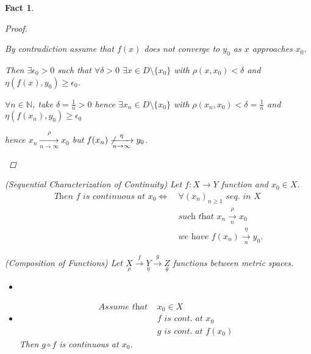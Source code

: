 \documentclass[12pt]{amsbook}
\newtheorem{fact}[theorem]{Fact}
\theoremstyle{definition}
\newcommand{\NN}{{\mathbb N}}
\newcommand{\Lra}{\Leftrightarrow} %
\newcommand{\ra}{\rightarrow} %
\begin{document}
\begin{fact}
\begin{proof}
\begin{itemize}
    By contradiction assume that $f(x)$ does not converge to $y_0$ as $x$ approaches $x_0$. 
    
    Then $\exists \epsilon_0 > 0$ such that $\forall \delta > 0$ $\exists x \in D \setminus \{x_0\}$ with $\rho(x, x_0) < \delta$ and $\eta(f(x), y_0) \geq \epsilon_0$.
    
    $\forall n \in \NN$, take $\delta = \frac{1}{n} > 0$ hence $\exists x_n \in D \setminus \{x_0\}$ with $\rho(x_n, x_0) < \delta = \frac{1}{n}$ and $\eta(f(x_n), y_0) \geq \epsilon_0$
    
    hence $x_n \xrightarrow[n \ra \infty]{\rho} x_0$ but $f(x_n) \not\xrightarrow[n \ra \infty]{\eta} y_0$. %
    \end{itemize}
    \end{proof}

\item[(4)] (Sequential Characterization of Continuity) Let $f: X \ra Y$ function and $x_0 \in X$. 
\begin{align}
\textit{Then } f \textit{ is continuous at } x_0 \Lra \ \nonumber
& \forall (x_n)_{n \geq 1} \textit{ seq. in } X \\ \nonumber
& \textit{such that } x_n \xrightarrow[n]{\rho} x_0 \\ \nonumber
& \textit{we have } f(x_n) \xrightarrow[n]{\eta} y_0 .
\end{align}


\item[(5)] (Composition of Functions) Let $\underset{\rho}X \overset{f}\ra \underset{\eta}Y \overset{g}\ra \underset{\theta}Z$ functions between metric spaces.
    \begin{itemize}
    \item[(i)] %
    \item[(ii)] \begin{align}
    \textit{Assume that } \nonumber
    & x_0 \in X \\ \nonumber
    & f \textit{ is cont. at } x_0 \\ \nonumber
    & g \textit{ is cont. at } f(x_0)
    \end{align}
    Then $g \circ f$ is continuous at $x_0$.
    \end{itemize}


\end{fact}
\end{document}

